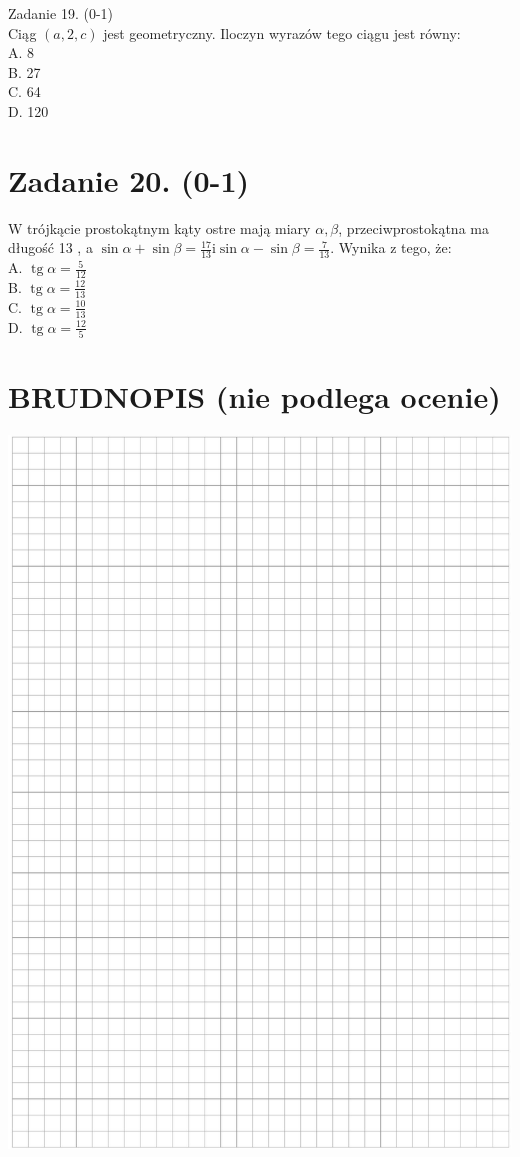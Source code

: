 \documentclass[10pt]{article}
\begin{document}
Zadanie 19. (0-1)\\
Ciąg \((a, 2, c)\) jest geometryczny. Iloczyn wyrazów tego ciągu jest równy:\\
A. 8\\
B. 27\\
C. 64\\
D. 120

\section*{Zadanie 20. (0-1)}
W trójkącie prostokątnym kąty ostre mają miary \(\alpha, \beta\), przeciwprostokątna ma długość 13 , a \(\sin \alpha+\sin \beta=\frac{17}{13} \mathrm{i} \sin \alpha-\sin \beta=\frac{7}{13}\). Wynika z tego, że:\\
A. \(\operatorname{tg} \alpha=\frac{5}{12}\)\\
B. \(\operatorname{tg} \alpha=\frac{12}{13}\)\\
C. \(\operatorname{tg} \alpha=\frac{10}{13}\)\\
D. \(\operatorname{tg} \alpha=\frac{12}{5}\)

\section*{BRUDNOPIS (nie podlega ocenie)}
\begin{center}
\includegraphics[max width=\textwidth]{2024_11_21_99eb8e6624b497a5af43g-07}
\end{center}
\end{document}
